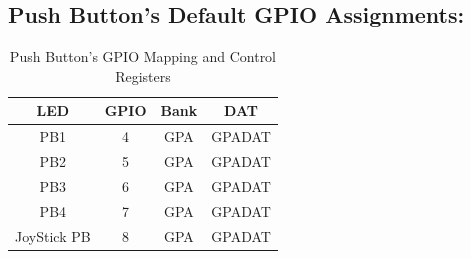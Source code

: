 \documentclass[11pt]{article}
\begin{document}
\subsection*{Push Button’s Default GPIO Assignments:}
%
\begin{table}[H]
    \centering
    \caption{Push Button's GPIO Mapping and Control Registers}
    \label{tab:push_button_gpio_mapping}
    \renewcommand{\arraystretch}{1.15}
    \begin{tabular}{cccc}
        \toprule
        \textbf{LED} & \textbf{GPIO} & \textbf{Bank} & \textbf{DAT} \\
        \midrule
        PB1  & 4  & GPA & GPADAT \\
        PB2  & 5  & GPA & GPADAT \\
        PB3  & 6  & GPA & GPADAT \\
        PB4  & 7  & GPA & GPADAT \\
        JoyStick PB  & 8 & GPA & GPADAT \\
        \bottomrule
    \end{tabular}
\end{table}
%
\end{document}
